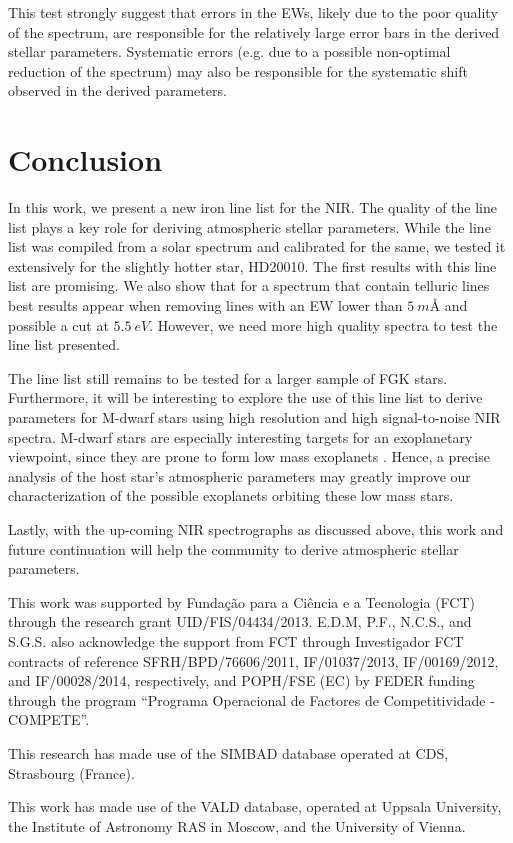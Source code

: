 \documentclass{aa}
\begin{document}
This test strongly suggest that errors in the EWs, likely due to the poor
quality of the spectrum, are responsible for the relatively large error bars
in the derived stellar parameters. Systematic errors (e.g. due to a possible
non-optimal reduction of the spectrum) may also be responsible for the
systematic shift observed in the derived parameters.

\section{Conclusion}
\label{sec:conclusion}

In this work, we present a new iron line list for the NIR. The quality
of the line list plays a key role for deriving atmospheric stellar
parameters. While the line list was compiled from a solar spectrum and
calibrated for the same, we tested it extensively for the slightly
hotter star, HD20010. The first results with this line list are
promising. We also show that for a spectrum that contain telluric
lines best results appear when removing lines with an EW lower than
$\SI{5}{m\angstrom}$ and possible a cut at $\SI{5.5}{eV}$. However,
we need more high quality spectra to test the line list presented.

The line list still remains to be tested for a larger sample of FGK
stars. Furthermore, it will be interesting to explore the use of this
line list to derive parameters for M-dwarf stars using high resolution
and high signal-to-noise NIR spectra. M-dwarf stars are especially interesting
targets for an exoplanetary viewpoint, since they are prone to form
low mass exoplanets \citep{Bonfils2013}. Hence, a precise analysis
of the host star's atmospheric parameters may greatly improve our
characterization of the possible exoplanets orbiting these low mass
stars.

Lastly, with the up-coming NIR spectrographs as discussed above,
this work and future continuation will help the community to derive
atmospheric stellar parameters.



\begin{acknowledgements}

This work was supported by Funda\c{c}\~ao para a Ci\^encia e a
Tecnologia (FCT) through the research grant UID/FIS/04434/2013.
E.D.M, P.F., N.C.S., and S.G.S. also acknowledge the support from FCT
through Investigador FCT contracts of reference SFRH/BPD/76606/2011,
IF/01037/2013, IF/00169/2012, and IF/00028/2014, respectively, and
POPH/FSE (EC) by FEDER funding through the program “Programa
Operacional de Factores de Competitividade - COMPETE”.

This research has made use of the SIMBAD database operated at CDS,
Strasbourg (France).

This work has made use of the VALD database, operated at Uppsala
University, the Institute of Astronomy RAS in Moscow, and the University
of Vienna.

\end{acknowledgements}








\end{document}
